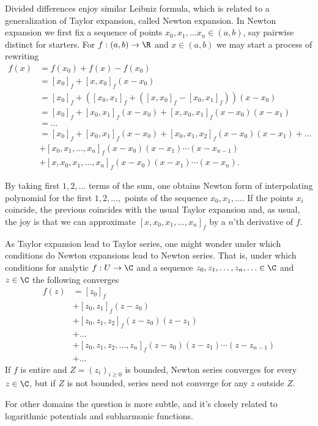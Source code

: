 Divided differences enjoy similar Leibniz formula, which is related to a generalization of Taylor expansion, called Newton expansion. In Newton expansion we first fix a sequence of points $x_{0}, x_{1}, \ldots x_{n} \in (a, b)$, say pairwise distinct for starters. For $f : (a, b) \to \R$ and $x \in (a, b)$ we may start a process of rewriting
\begin{align*}
	f(x) &= f(x_0) + f(x) - f(x_{0}) \\
	&= [x_{0}]_{f} + [x, x_{0}]_{f} (x - x_{0}) \\
	&= [x_{0}]_{f} + ([x_{0}, x_{1}]_{f} + ([x, x_{0}]_{f}- [x_{0}, x_{1}]_{f}))(x - x_{0}) \\
	&= [x_{0}]_{f} + [x_{0}, x_{1}]_{f} (x - x_{0})  + [x, x_{0}, x_{1}]_{f} (x - x_{0}) (x - x_{1}) \\
	&= \ldots \\
	&= [x_{0}]_{f} + [x_{0}, x_{1}]_{f} (x - x_{0})  + [x_{0}, x_{1}, x_{2}]_{f} (x - x_{0}) (x - x_{1}) + \ldots \\
	& + [x_{0}, x_{1}, \ldots, x_{n}]_{f} (x - x_{0}) (x - x_{1}) \cdots (x - x_{n - 1}) \\
	& + [x, x_{0}, x_{1}, \ldots, x_{n}]_{f} (x - x_{0}) (x - x_{1}) \cdots (x - x_{n}).
\end{align*}

By taking first $1, 2, \ldots$ terms of the sum, one obtains Newton form of interpolating polynomial for the first $1, 2, \ldots, $ points of the sequence $x_{0}, x_{1}, \ldots$. If the points $x_{i}$ coincide, the previous coincides with the usual Taylor expansion and, as usual, the joy is that we can approximate $[x, x_{0}, x_{1}, \ldots, x_{n}]_{f}$ by a $n$'th derivative of $f$.

\begin{huom}
	As Taylor expansion lead to Taylor series, one might wonder under which conditions do Newton expansions lead to Newton series. That is, under which conditions for analytic $f : U \to \C$ and a sequence $z_{0}, z_{1}, \ldots, z_{n}, \ldots \in \C$ and $z \in \C$ the following converges
	\begin{align*}
		f(z) &= [z_{0}]_{f} \\
		&+ [z_{0}, z_{1}]_{f} (z - z_{0}) \\
		&+ [z_{0}, z_{1}, z_{2}]_{f} (z - z_{0}) (z - z_{1}) \\
		&+ \ldots \\
		&+ [z_{0}, z_{1}, z_{2}, \ldots, z_{n}]_{f} (z - z_{0}) (z - z_{1}) \cdots (z - z_{n - 1}) \\
		&+ \ldots
	\end{align*}
	If $f$ is entire and $Z = (z_{i})_{i \geq 0}$ is bounded, Newton series converges for every $z \in \C$, but if $Z$ is not bounded, series need not converge for any $z$ outside $Z$.

	For other domains the question is more subtle, and it's closely related to logarithmic potentials and subharmonic functions.
\end{huom}

